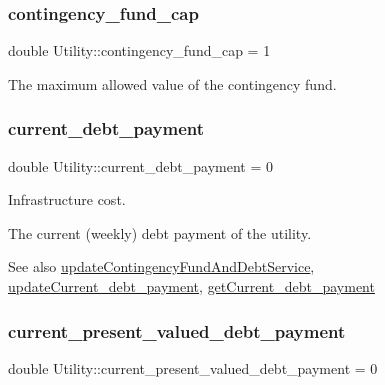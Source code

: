 \subsubsection{\texorpdfstring{contingency\+\_\+fund\+\_\+cap}{contingency\_fund\_cap}}
{\footnotesize\ttfamily double Utility\+::contingency\+\_\+fund\+\_\+cap = 1\hspace{0.3cm}{\ttfamily [private]}}



The maximum allowed value of the contingency fund. 

\mbox{\label{classUtility_a74b8caabf26e3bbf87871514b0ad7ee1}} 
\subsubsection{\texorpdfstring{current\+\_\+debt\+\_\+payment}{current\_debt\_payment}}
{\footnotesize\ttfamily double Utility\+::current\+\_\+debt\+\_\+payment = 0\hspace{0.3cm}{\ttfamily [private]}}



Infrastructure cost. 

The current (weekly) debt payment of the utility. \begin{DoxySeeAlso}{See also}
\mbox{\hyperlink{classUtility_ab663efd526505a3d843cae7075cc3b91}{update\+Contingency\+Fund\+And\+Debt\+Service}}, \mbox{\hyperlink{classUtility_a63f5ae95014d9e729a3de51f19540042}{update\+Current\+\_\+debt\+\_\+payment}}, \mbox{\hyperlink{classUtility_ab0e6984f9bad9d5d2a756f015216f54f}{get\+Current\+\_\+debt\+\_\+payment}} 
\end{DoxySeeAlso}
\mbox{\label{classUtility_ad94ee8d23bf42c9a2eac017d42100f68}} 
\subsubsection{\texorpdfstring{current\+\_\+present\+\_\+valued\+\_\+debt\+\_\+payment}{current\_present\_valued\_debt\_payment}}
{\footnotesize\ttfamily double Utility\+::current\+\_\+present\+\_\+valued\+\_\+debt\+\_\+payment = 0\hspace{0.3cm}{\ttfamily [private]}}



